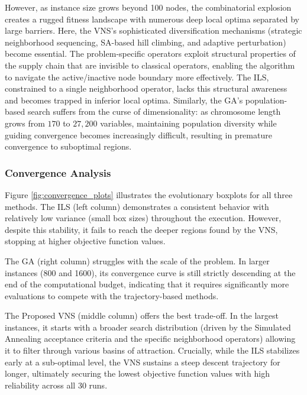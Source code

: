 \documentclass[preprint,12pt,authoryear]{elsarticle}
\begin{document}
However, as instance size grows beyond 100 nodes, the combinatorial explosion creates a rugged fitness landscape with numerous deep local optima separated by large barriers. 
Here, the VNS's sophisticated diversification mechanisms (strategic neighborhood sequencing, SA-based hill climbing, and adaptive perturbation) become essential. The problem-specific 
operators exploit structural properties of the supply chain that are invisible to classical operators, enabling the algorithm to navigate 
the active/inactive node boundary more effectively. The ILS, constrained to a single neighborhood operator, lacks this structural awareness and becomes trapped in inferior local optima. 
Similarly, the GA's population-based search suffers from the curse of dimensionality: as chromosome length grows from $170$ to $27{,}200$ variables, maintaining population diversity while
guiding convergence becomes increasingly difficult, resulting in premature convergence to suboptimal regions.

\subsubsection{Convergence Analysis}
Figure \ref{fig:convergence_plots} illustrates the evolutionary boxplots for all three methods. The ILS (left column) demonstrates a consistent behavior with relatively low 
variance (small box sizes) throughout the execution. However, despite this stability, it fails to reach the deeper regions found by the VNS, stopping at higher objective function values.

The GA (right column) struggles with the scale of the problem. In larger instances (800 and 1600), its convergence curve is still strictly descending at the end of the 
computational budget, indicating that it requires significantly more evaluations to compete with the trajectory-based methods.

The Proposed VNS (middle column) offers the best trade-off. In the largest instances, it starts with a broader search distribution (driven 
by the Simulated Annealing acceptance criteria and the specific neighborhood operators) allowing it to filter through various basins of attraction. Crucially, while the ILS 
stabilizes early at a sub-optimal level, the VNS sustains a steep descent trajectory for longer, ultimately securing the lowest objective function values with high 
reliability across all 30 runs.
\end{document}
